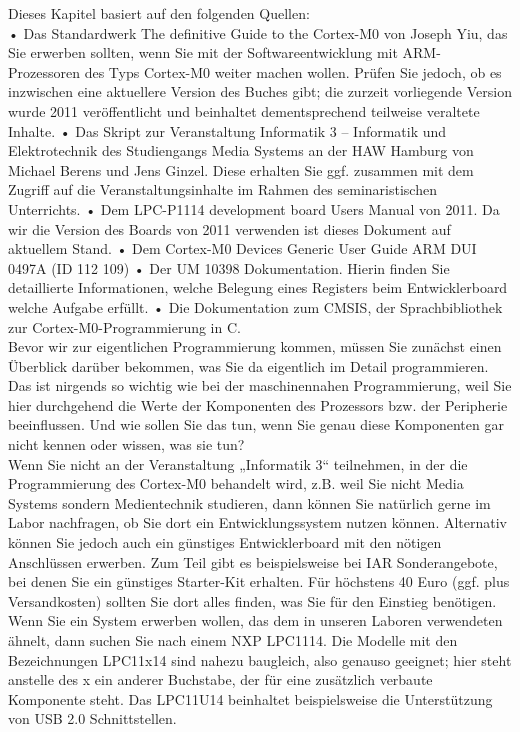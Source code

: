 Dieses Kapitel basiert auf den folgenden Quellen: \\

•	Das Standardwerk The definitive Guide to the Cortex-M0 von Joseph Yiu, das Sie erwerben sollten, wenn Sie mit der Softwareentwicklung mit ARM-Prozessoren des Typs Cortex-M0 weiter machen wollen. Prüfen Sie jedoch, ob es inzwischen eine aktuellere Version des Buches gibt; die zurzeit vorliegende Version wurde 2011 veröffentlicht und beinhaltet dementsprechend teilweise veraltete Inhalte.
•	Das Skript zur Veranstaltung Informatik 3 – Informatik und Elektrotechnik des Studiengangs Media Systems an der HAW Hamburg von Michael Berens und Jens Ginzel. Diese erhalten Sie ggf. zusammen mit dem Zugriff auf die Veranstaltungsinhalte im Rahmen des seminaristischen Unterrichts.
•	Dem LPC-P1114 development board Users Manual von 2011. Da wir die Version des Boards von 2011 verwenden ist dieses Dokument auf aktuellem Stand.
•	Dem Cortex-M0 Devices Generic User Guide ARM DUI 0497A (ID 112 109)
•	Der UM 10398 Dokumentation. Hierin finden Sie detaillierte Informationen, welche Belegung eines Registers beim Entwicklerboard welche Aufgabe erfüllt.
•	Die Dokumentation zum CMSIS, der Sprachbibliothek zur Cortex-M0-Programmierung in C.\\

Bevor wir zur eigentlichen Programmierung kommen, müssen Sie zunächst einen Überblick darüber bekommen, was Sie da eigentlich im Detail programmieren. Das ist nirgends so wichtig wie bei der maschinennahen Programmierung, weil Sie hier durchgehend die Werte der Komponenten des Prozessors bzw. der Peripherie beeinflussen. Und wie sollen Sie das tun, wenn Sie genau diese Komponenten gar nicht kennen oder wissen, was sie tun?\\

Wenn Sie nicht an der Veranstaltung „Informatik 3“ teilnehmen, in der die Programmierung des Cortex-M0 behandelt wird, z.B. weil Sie nicht Media Systems sondern Medientechnik studieren, dann können Sie natürlich gerne im Labor nachfragen, ob Sie dort ein Entwicklungssystem nutzen können. Alternativ können Sie jedoch auch ein günstiges Entwicklerboard mit den nötigen Anschlüssen erwerben. Zum Teil gibt es beispielsweise bei IAR  Sonderangebote, bei denen Sie ein günstiges Starter-Kit erhalten. Für höchstens 40 Euro (ggf. plus Versandkosten) sollten Sie dort alles finden, was Sie für den Einstieg benötigen. Wenn Sie ein System erwerben wollen, das dem in unseren Laboren verwendeten ähnelt, dann suchen Sie nach einem NXP LPC1114. Die Modelle mit den Bezeichnungen LPC11x14 sind nahezu baugleich, also genauso geeignet; hier steht anstelle des x ein anderer Buchstabe, der für eine zusätzlich verbaute Komponente steht. Das LPC11U14 beinhaltet beispielsweise die Unterstützung von USB 2.0 Schnittstellen.\\


